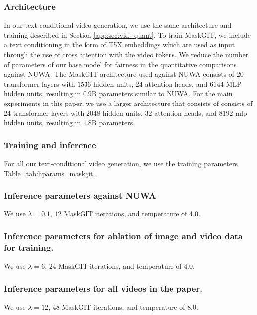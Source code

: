 \subsubsection{Architecture}
In our text conditional video generation, we use the same \cvivit architecture and training described in Section \ref{app:sec:vid_quant}.
To train MaskGIT, we include a text conditioning in the form of T5X embeddings \cite{roberts2022scaling} which are used as input through the use of cross attention with the video tokens. 
We reduce the number of parameters of our base model for fairness in the quantitative comparisons against NUWA. The MaskGIT architecture used against NUWA consists of $20$ transformer layers with $1536$ hidden units, $24$ attention heads, and $6144$ MLP hidden units, resulting in $0.9\text{B}$ parameters similar to NUWA. For the main experiments in this paper, we use a larger architecture that consists of consists of $24$ transformer layers with $2048$ hidden units, $32$ attention heads, and $8192$ mlp hidden units, resulting in $1.8\text{B}$ parameters.

\subsubsection{Training and inference}
For all our text-conditional video generation, we use the training parameters Table~\ref{tab:hparams_maskgit}.

\subsubsection{Inference parameters against NUWA}
We use $\lambda=0.1$, $12$ MaskGIT iterations, and temperature of $4.0$. 

\subsubsection{Inference parameters for ablation of image and video data for training.}
We use $\lambda=6$, $24$ MaskGIT iterations, and temperature of $4.0$. 

\subsubsection{Inference parameters for all videos in the paper.}
We use $\lambda=12$, $48$ MaskGIT iterations, and temperature of $8.0$. 


